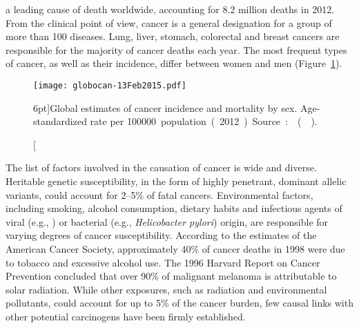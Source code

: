  a leading cause of death worldwide, accounting
for 8.2 million deaths in 2012.  From the clinical point of view, cancer is a
general designation for a group of more than 100 diseases.  Lung, liver,
stomach, colorectal and breast cancers are responsible for the majority of
cancer deaths each year.  The most frequent types of cancer, as well as their
incidence, differ between women and men (Figure~\ref{fig:globocan}).

\begin{figure}[ht]
  \texttt{[image: globocan-13Feb2015.pdf]}
  \caption[Global estimates of cancer incidence and mortality by
  sex][6pt]{Global estimates of cancer incidence and mortality by sex.
    \mbox{Age-standardized} rate per \SI{100000} population (2012).  Source:
    \mbox{} (\citealp{ferlay_globocan_2014}).}
  \label{fig:globocan}
\end{figure}

The list of factors involved in the causation of cancer is wide and diverse.
Heritable genetic susceptibility, in the form of highly penetrant, dominant
allelic variants, could account for \numrange{2}{5}\% of fatal cancers.
Environmental factors, including smoking, alcohol consumption, dietary habits
and infectious agents of viral (e.g., ) or bacterial (e.g.,
\emph{Helicobacter pylori}) origin, are responsible for varying degrees of
cancer susceptibility.\cite{cassidy_oxford_2010} According to the estimates of
the American Cancer Society, approximately 40\% of cancer deaths in 1998 were
due to tobacco and excessive alcohol use.  The 1996 Harvard Report on Cancer
Prevention concluded that over 90\% of malignant melanoma is attributable to
solar radiation.  While other exposures, such as radiation and environmental
pollutants, could account for up to 5\% of the cancer burden, few causal links
with other potential carcinogens have been firmly established.

